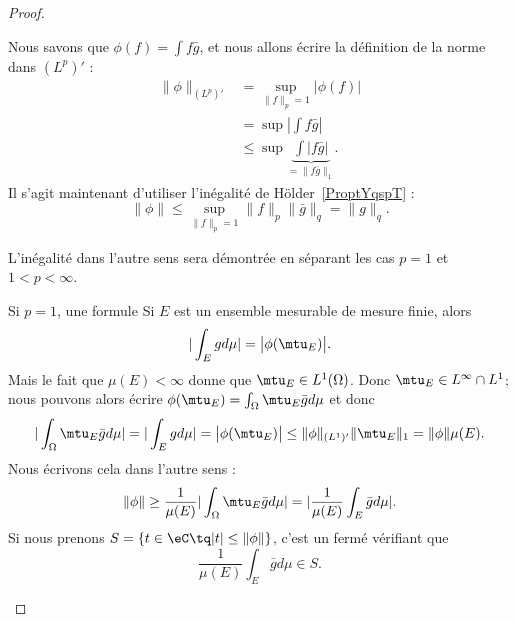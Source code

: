 \begin{proof}
\begin{subproof}
            Nous savons que \( \phi(f)=\int f\bar g\), et nous allons écrire la définition de la norme dans \( (L^p)'\) :
            \begin{subequations}
                \begin{align}
                    \| \phi \|_{(L^p)'}&=\sup_{\| f \|_p=1}\big| \phi(f) \big|\\
                    &=\sup| \int f\bar g |\\
                    &\leq\sup\underbrace{\int| f\bar g |}_{=\| f\bar g \|_1}.
                \end{align}
            \end{subequations}
            Il s'agit maintenant d'utiliser l'inégalité de Hölder~\ref{ProptYqspT} :
            \begin{equation}
                \| \phi \|\leq \sup_{\| f \|_p=1}\| f \|_p\| \bar g \|_q=\| g \|_q.
            \end{equation}

            L'inégalité dans l'autre sens sera démontrée en séparant les cas \( p=1\) et \( 1<p<\infty\).

        \item[Si \( p=1\), une formule]
            Si \( E\) est un ensemble mesurable de mesure finie, alors
            \begin{equation}
                | \int_Egd\mu |=\big| \phi(\mtu_E) \big|.
            \end{equation}
            Mais le fait que \( \mu(E)<\infty\) donne que \( \mtu_E\in L^1(\Omega)\). Donc \( \mtu_E\in L^{\infty}\cap L^1\); nous pouvons alors écrire \( \phi(\mtu_E)=\int_{\Omega}\mtu_E\bar gd\mu\) et donc
            \begin{equation}    \label{EqUPCTooJvoKKI}
                | \int_{\Omega}\mtu_E\bar gd\mu |=|\int_Egd\mu |=\big| \phi(\mtu_E) \big|\leq \| \phi \|_{(L^1)'}\| \mtu_E \|_1=\| \phi \|\mu(E).
            \end{equation}
            Nous écrivons cela dans l'autre sens :
            \begin{equation}
                \| \phi \|\geq \frac{1}{ \mu(E) }| \int_{\Omega}\mtu_E\bar gd\mu |=| \frac{1}{ \mu(E) }\int_E\bar gd\mu |.
            \end{equation}
            Si nous prenons \( S=\{ t\in \eC\tq | t |\leq \| \phi \| \}\), c'est un fermé vérifiant que
            \begin{equation}        \label{EQooMRLGooYPEjUo}
                \frac{1}{ \mu(E) }\int_E\bar gd\mu\in S.
            \end{equation}


\end{subproof}
\end{proof}
